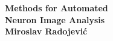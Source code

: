 %
%

\setlength{\parindent}{0pt}
\thispagestyle{empty}


\begin{center}
  \vspace*{5mm}
  {\huge\bf Methods for Automated\\[0.3ex] Neuron Image Analysis\\}
  \vspace{12.85cm}
  {\large\bf Miroslav Radojevi\'{c}}
\end{center}
\setlength{\parindent}{\myindent}


